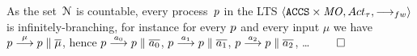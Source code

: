 \begin{example}
  As the set~$\mathcal{N}$ is countable, every process~$p$ in
  the LTS $\lts{\ACCS \times \MO}{\Acttau}{\sta{}}$ is
  infinitely-branching, %
  for instance for every $p$ and every input $\mu$ we have %
    $ p \mathrel{\overset{\mu}\longrightarrow} p \mathrel{\parallel} \overline{\mu}$, %
    hence $p \mathrel{\overset{a_0}\longrightarrow} p \mathrel{\parallel} \overline{a_0}$,
    $p \mathrel{\overset{a_1}\longrightarrow} p \mathrel{\parallel} \overline{a_1}$,
    $p \mathrel{\overset{a_2}\longrightarrow} p \mathrel{\parallel} \overline{a_2}$, \ldots
  \hfill$\qed$







\end{example}

